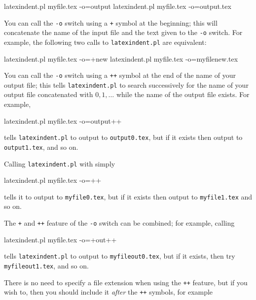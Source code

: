 \documentclass[10pt]{article}
\begin{document}
 \begin{commandshell}
latexindent.pl myfile.tex -o=output
latexindent.pl myfile.tex -o=output.tex
\end{commandshell}

 You can call the \texttt{-o} switch using a \texttt{+} symbol at the beginning; this
 will  concatenate the name of the input file
 and the text given to the \texttt{-o} switch. For example, the following two calls to
 \texttt{latexindent.pl} are equivalent:%

 \begin{commandshell}
latexindent.pl myfile.tex -o=+new
latexindent.pl myfile.tex -o=myfilenew.tex
\end{commandshell}

 You can call the \texttt{-o} switch using a \texttt{++} symbol at the end of the name
  of your output file; this tells
 \texttt{latexindent.pl} to search successively for the name of your output file
 concatenated with $0, 1, \ldots$ while the name of the output file exists. For example,%

 \begin{commandshell}
latexindent.pl myfile.tex -o=output++
\end{commandshell}

 tells \texttt{latexindent.pl} to output to \texttt{output0.tex}, but if it exists then
 output to \texttt{output1.tex}, and so on.

 Calling \texttt{latexindent.pl} with simply

 \begin{commandshell}
latexindent.pl myfile.tex -o=++
\end{commandshell}

 tells it to output to \texttt{myfile0.tex}, but if it exists then output to
 \texttt{myfile1.tex} and so on.

 The \texttt{+} and \texttt{++} feature of the \texttt{-o} switch can be combined; for
 example, calling

 \begin{commandshell}
latexindent.pl myfile.tex -o=+out++
\end{commandshell}

 tells \texttt{latexindent.pl} to output to \texttt{myfileout0.tex}, but if it exists,
 then try \texttt{myfileout1.tex}, and so on.

 There is no need to specify a file extension when using the \texttt{++} feature, but if
 you wish to, then you should include it \emph{after} the \texttt{++} symbols, for
 example
\end{document}
